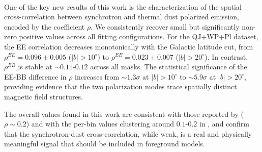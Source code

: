 
\paragraph{}

One of the key new results of this work is the characterization of the spatial cross-correlation between synchrotron and thermal dust polarized emission, encoded by the coefficient $\rho$. We consistently recover small but significantly non-zero positive values across all fitting configurations. For the QJ+WP+Pl dataset, the EE correlation decreases monotonically with the Galactic latitude cut, from $\rho^{EE} = 0.096 \pm 0.005$ ($|b| > 10^\circ$) to $\rho^{EE} = 0.023 \pm 0.007$ ($|b| > 20^\circ$). In contrast, $\rho^{BB}$ is stable at $\sim 0.11$-$0.12$ across all masks. The statistical significance of the EE-BB difference in $\rho$ increases from $\sim 1.3\sigma$ at $|b| > 10^\circ$ to $\sim 5.9\sigma$ at $|b| > 20^\circ$, providing evidence that the two polarization modes trace spatially distinct magnetic field structures. 

The overall values found in this work are consistent with those reported by \citet{Choi_2015} ($\rho \sim 0.2$) and with the per-bin values clustering around $0.1$-$0.2$ in \citet{Krachmalnicoff_2018}, and confirm that the synchrotron-dust cross-correlation, while weak, is a real and physically meaningful signal that should be included in foreground models.


